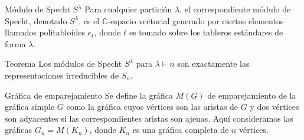 \documentclass[final,xcolor=svgnames]{beamer}
\begin{document}
\begin{frame}{}
\begin{columns}
\begin{column}{0.5\textwidth}

      \begin{block}{Módulo de Specht $S^{\lambda}$}
        Para cualquier partición $\lambda$, el correspondiente
        \alert{módulo de Specht}, denotado $S^{\lambda}$, es el
        $\mathbb{C}$-espacio vectorial generado por ciertos elementos llamados
        politabloides $e_{t}$, donde $t$ es tomado sobre los
        tableros estándares de forma
        $\lambda$.

      \end{block} 

       \begin{block}{Teorema}
         Los módulos de Specht $S^{\lambda}$ para $\lambda\vdash n$
         son exactamente las representaciones irreducibles de
         $S_{n}$.
     \end{block}

     \begin{block}{Gráfica de emparejamiento}
       Se define la \alert{gráfica $M(G)$ de emparejamiento} de la gráfica
       simple $G$ como la gráfica cuyos vértices son las aristas de
       $G$ y dos vértices son adyacentes si las correspondientes
       aristas son ajenas. Aquí consideramos las gráficas
       $G_{n}=M(K_{n})$, donde $K_{n}$ es una gráfica completa de $n$ vértices.
     \end{block}
     

\end{column}
\end{columns}
\end{frame}
\end{document}
